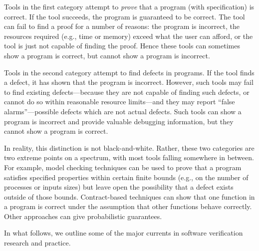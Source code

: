Tools in the first category attempt to \emph{prove} that a program (with specification) is correct.  If the tool succeeds, the program is guaranteed to be correct.  The tool can fail to find a proof for a number of reasons: the program is incorrect, the resources required (e.g., time or memory) exceed what the user can afford, or the tool is just not capable of finding the proof.  Hence these tools can sometimes show a program is correct, but cannot show a program is incorrect.

Tools in the second category attempt to find defects in programs.  If the tool finds a defect, it has shown that the program is incorrect.  However, such tools may fail to find existing defects---because they are not capable of finding such defects, or cannot do so within reasonable resource limits---and they may report ``false alarms''---possible defects which are not actual defects.  Such tools can show a program is incorrect and provide valuable debugging information, but they cannot show a program is correct.

In reality, this distinction is not black-and-white. Rather, these two categories are two extreme points on a spectrum, with most tools falling somewhere in between.  For example, model checking techniques can be used to prove that a program satisfies specified properties within certain finite bounds (e.g., on the number of processes or inputs sizes) but leave open the possibility that a defect exists outside of those bounds.  Contract-based techniques can show that one function in a program is correct under the assumption that other functions behave correctly.   Other approaches can give probabilistic guarantees.  

In what follows, we outline some of the major currents in software verification research and practice.


